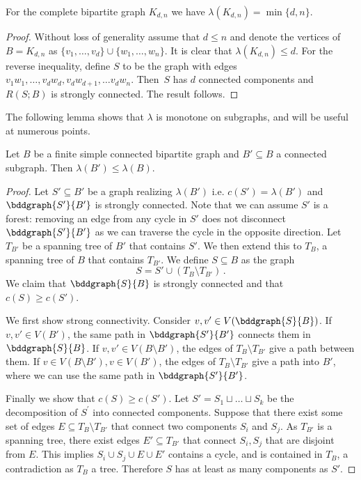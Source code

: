 \begin{lemma}\label{lem: recbipartite}
For the complete bipartite graph $K_{d,n}$ we have $\lambda(K_{d,n}) = \min\{d,n\}$.
\end{lemma}

\begin{proof}
Without loss of generality assume that $d \leq n$ and denote the vertices of $B = K_{d,n}$ as $\{v_1, \dots, v_d\} \cup \{w_1, \dots, w_n\}$.  It is clear that $\lambda(K_{d,n}) \leq d$. For the reverse inequality, define $S$ to be the graph with edges $v_1w_1, \dots, v_dw_d, v_dw_{d+1}, \dots v_dw_n$. Then~$S$ has $d$ connected components and $R(S;B)$ is strongly connected.  The result follows.
\end{proof}

The following lemma shows that $\lambda$ is monotone on subgraphs, and will be useful at numerous points.
\begin{lemma}\label{lem: lambda+monotone}
Let $B$ be a finite simple connected bipartite graph and $B' \subseteq B$ a connected subgraph.
Then $\lambda(B') \leq \lambda(B)$.
\end{lemma}
\begin{proof}
Let $S' \subseteq B'$ be a graph realizing $\lambda(B')$ i.e. $c(S') = \lambda(B')$ and $\bddgraph{S'}{B'}$ is strongly connected.
Note that we can assume $S'$ is a forest: removing an edge from any cycle in $S'$ does not disconnect $\bddgraph{S'}{B'}$ as we can traverse the cycle in the opposite direction.
Let $T_{B'}$ be a spanning tree of $B'$ that contains $S'$.
We then extend this to $T_B$, a spanning tree of $B$ that contains $T_{B'}$.
We define $S \subseteq B$ as the graph
\[
S = S' \cup \left(T_B \setminus T_{B'}\right) \, .
\]
We claim that $\bddgraph{S}{B}$ is strongly connected and that $c(S) \geq c(S')$.

We first show strong connectivity.
Consider $v, v' \in V(\bddgraph{S}{B})$.
If $v, v' \in V(B')$, the same path in $\bddgraph{S'}{B'}$ connects them in $\bddgraph{S}{B}$.
If $v, v' \in V(B \setminus B')$, the edges of $T_B \setminus T_{B'}$ give a path between them.
If $v \in V(B \setminus B'), v \in V(B')$, the edges of $T_B \setminus T_{B'}$ give a path into $B'$, where we can use the same path in $\bddgraph{S'}{B'}$.

Finally we show that $c(S) \geq c(S')$.
Let $S' = S_1 \sqcup \dots \sqcup S_k$ be the decomposition of $S^\prime$ into connected components.
Suppose that there exist some set of edges $E \subseteq T_B \setminus T_{B'}$ that connect two components $S_i$ and $S_j$.
As $T_{B'}$ is a spanning tree, there exist edges $E' \subseteq T_{B'}$ that connect $S_i, S_j$ that are disjoint from $E$.
This implies $S_i \cup S_j \cup E \cup E'$ contains a cycle, and is contained in $T_B$, a contradiction as $T_B$ a tree.
Therefore $S$ has at least as many components as $S'$.
\end{proof}

